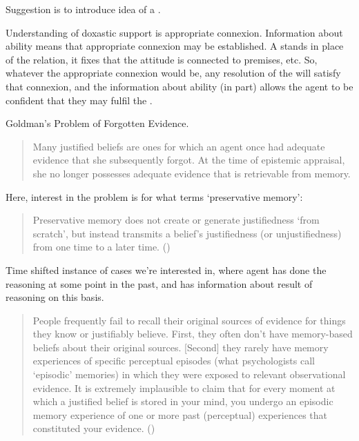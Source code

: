 \hozlinedash{}

\begin{note}[\future{}]
  Suggestion is to introduce idea of a \future{}.

  Understanding of doxastic support is appropriate connexion.
  Information about ability means that appropriate connexion may be established.
  A \future{} stands in place of the relation, it fixes that the attitude is connected to premises, etc.
  So, whatever the appropriate connexion would be, any resolution of the \future{} will satisfy that connexion, and the information about ability (in part) allows the agent to be confident that they may fulfil the \future{}.
\end{note}

\hozline{}


\begin{note}
  Goldman's Problem of Forgotten Evidence.

  \begin{quote}
    Many justified beliefs are ones for which an agent once had adequate evidence that she subsequently forgot. At the time of epistemic appraisal, she no longer possesses adequate evidence that is retrievable from memory.
  \end{quote}

  Here, interest in the problem is for what \citeauthor{Goldman:2011vn} terms `preservative memory':
  \begin{quote}
    Preservative memory does not create or generate justifiedness `from scratch', but instead transmits a belief's justifiedness (or unjustifiedness) from one time to a later time.\nolinebreak
    \mbox{}\hfill\mbox{(\citeyear[259--260]{Goldman:2011vn})}
  \end{quote}
  Time shifted instance of cases we're interested in, where agent has done the reasoning at some point in the past, and has information about result of reasoning on this basis.

  \begin{quote}
    People frequently fail to recall their original sources of evidence for things they know or justiﬁably believe.
    First, they often don’t have memory-based beliefs about their original sources.
    [Second] they rarely have memory experiences of speciﬁc perceptual episodes (what psychologists call `episodic' memories) in which they were exposed to relevant observational evidence.
    It is extremely implausible to claim that for every moment at which a justiﬁed belief is stored in your mind, you undergo an episodic memory experience of one or more past (perceptual) experiences that constituted your evidence.\nolinebreak
    \mbox{}\hfill\mbox{(\citeyear[266--267]{Goldman:2011vn})}
  \end{quote}


\end{note}
